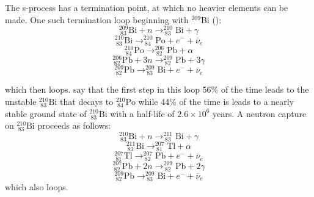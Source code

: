 The s-process has a termination point, at which no heavier elements
can be made.  One such termination loop beginning with $^{209}$Bi
(\citealt{claytonetal1961}):
\begin{equation*}
^{209}_{\ 83}\textrm{Bi} + n  \rightarrow ^{210}_{\ 83}\textrm{Bi} +
\gamma 
\end{equation*}
\begin{equation*}
^{210}_{\ 83}\textrm{Bi}   \rightarrow ^{210}_{\ 84}\textrm{Po} +
e^- + \overline{\nu}_e 
\end{equation*}
\begin{equation*}
^{210}_{\ 84}\textrm{Po}   \rightarrow ^{206}_{\ 82}\textrm{Pb} +
\alpha 
\end{equation*}
\begin{equation*}
^{206}_{\ 82}\textrm{Pb} + 3n  \rightarrow ^{209}_{\ 82}\textrm{Pb} +
3\gamma 
\end{equation*}
\begin{equation}
\label{eq:firsttermination}
^{209}_{\ 82}\textrm{Pb}  \rightarrow ^{209}_{\ 83}\textrm{Bi} + e^-
+ \overline{\nu}_e
\end{equation}

which then loops.  \cite{claytonetal1961} say that the first step in this loop 56\% of
the time leads to the unstable $^{210}_{\ 83}\textrm{Bi}$ that decays
to $^{210}_{\ 84}\textrm{Po}$ while 44\% of the time is leads to a
nearly stable ground state of $^{210}_{\ 83}\textrm{Bi}$ with a
half-life of $2.6 \times 10^6$ years.  A neutron capture
on $^{210}_{\ 83}\textrm{Bi}$ proceeds as follows:
\begin{equation*}
^{210}_{\ 83}\textrm{Bi} + n  \rightarrow ^{211}_{\ 83}\textrm{Bi} +
\gamma
\end{equation*}
\begin{equation*}
^{211}_{\ 83}\textrm{Bi}  \rightarrow ^{207}_{\ 81}\textrm{Tl} + \alpha
\end{equation*}
\begin{equation*}
 ^{207}_{\ 81}\textrm{Tl}  \rightarrow  ^{207}_{\ 82}\textrm{Pb} + e^-
 + \overline{\nu}_e
\end{equation*}
\begin{equation*}
^{207}_{\ 82}\textrm{Pb} + 2n  \rightarrow ^{209}_{\ 82}\textrm{Pb} +
2\gamma
\end{equation*}
\begin{equation}
\label{eq:secondtermination}
^{209}_{\ 82}\textrm{Pb}  \rightarrow ^{209}_{\ 83}\textrm{Bi} + e^- + \overline{\nu}_e
\end{equation}
which also loops.

